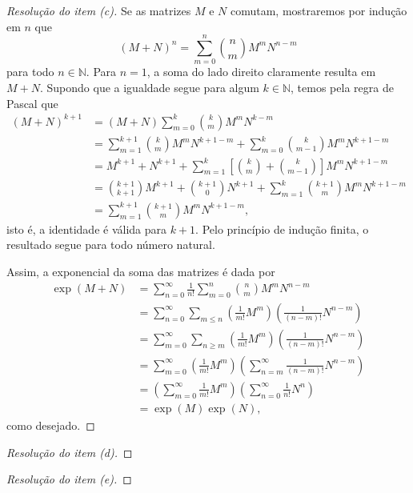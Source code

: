 \begin{proof}[Resolução do item (c)]
    Se as matrizes \(M\) e \(N\) comutam, mostraremos por indução em \(n\) que
    \begin{equation*}
        (M + N)^n = \sum_{m = 0}^{n} \binom{n}{m} M^m N^{n-m}
    \end{equation*}
    para todo \(n \in \mathbb{N}\). Para \(n = 1\), a soma do lado direito claramente resulta em \(M + N\). Supondo que a igualdade segue para algum \(k \in \mathbb{N}\), temos pela regra de Pascal que
    \begin{align*}
        (M+N)^{k+1} &= (M+N)\sum_{m=0}^k\binom{k}{m} M^m N^{k-m}\\
                    &= \sum_{m = 1}^{k+1} \binom{k}{m} M^m N^{k+1-m} + \sum_{m=0}^{k} \binom{k}{m-1} M^m N^{k+1-m}\\
                    &= M^{k+1} + N^{k+1} + \sum_{m=1}^{k} \left[\binom{k}{m} + \binom{k}{m-1}\right] M^m N^{k+1-m}\\
                    &= \binom{k+1}{k+1} M^{k+1} + \binom{k+1}{0}N^{k+1} + \sum_{m=1}^{k} \binom{k+1}{m} M^m N^{k+1-m}\\
                    &= \sum_{m=1}^{k+1} \binom{k+1}{m} M^m N^{k+1 - m},
    \end{align*}
    isto é, a identidade é válida para \(k+1\). Pelo princípio de indução finita, o resultado segue para todo número natural.

    Assim, a exponencial da soma das matrizes é dada por
    \begin{align*}
        \exp(M+N) &= \sum_{n = 0}^\infty \frac{1}{n!} \sum_{m=0}^n \binom{n}{m} M^m N^{n - m}\\
                  &= \sum_{n=0}^\infty \sum_{m\leq n} \left(\frac{1}{m!}M^m\right) \left(\frac{1}{(n-m)!} N^{n-m}\right)\\
                  &= \sum_{m=0}^\infty \sum_{n \geq m} \left(\frac{1}{m!} M^m\right) \left(\frac{1}{(n-m)!}N^{n-m}\right)\\
                  &= \sum_{m=0}^\infty \left(\frac{1}{m!} M^m\right) \left(\sum_{n=m}^\infty \frac{1}{(n-m)!} N^{n-m}\right)\\
                  &= \left(\sum_{m=0}^\infty \frac{1}{m!} M^m\right)\left(\sum_{n= 0}^\infty \frac{1}{n!} N^n\right)\\
                  &= \exp(M)\exp(N),
    \end{align*}
    como desejado.
\end{proof}
\begin{proof}[Resolução do item (d)]

\end{proof}
\begin{proof}[Resolução do item (e)]

\end{proof}
